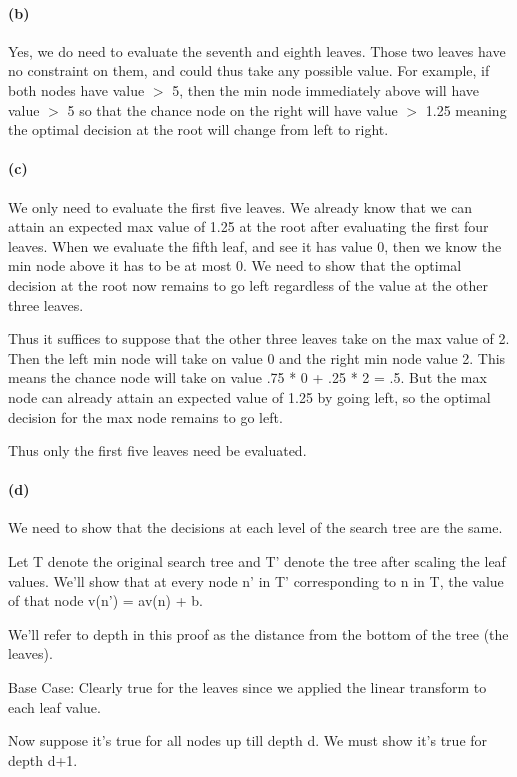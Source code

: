 \documentclass[11pt,a4paper]{article}
\begin{document}
\paragraph*{(b)}
Yes, we do need to evaluate the seventh and eighth leaves. Those two leaves have no constraint on them, and could thus take any possible value. For example, if both nodes have value $>$ 5, then the min node immediately above will have value $>$ 5 so that the chance node on the right will have value $>$ 1.25 meaning the optimal decision at the root will change from left to right.

\paragraph*{(c)}
We only need to evaluate the first five leaves. We already know that we can attain an expected max value of 1.25 at the root after evaluating the first four leaves. When we evaluate the fifth leaf, and see it has value 0, then we know the min node above it has to be at most 0. We need to show that the optimal decision at the root now remains to go left regardless of the value at the other three leaves. 

Thus it suffices to suppose that the other three leaves take on the max value of 2. Then the left min node will take on value 0 and the right min node value 2. This means the chance node will take on value .75 * 0 + .25 * 2 = .5. But the max node can already attain an expected value of 1.25 by going left, so the optimal decision for the max node remains to go left. 

Thus only the first five leaves need be evaluated.

\paragraph*{(d)}
We need to show that the decisions at each level of the search tree are the same.

Let T denote the original search tree and T' denote the tree after scaling the leaf values. We'll show that at every node n' in T' corresponding to n in T, the value of that node v(n') = av(n) + b.

We'll refer to depth in this proof as the distance from the bottom of the tree (the leaves). 

Base Case: Clearly true for the leaves since we applied the linear transform to each leaf value.

Now suppose it's true for all nodes up till depth d. We must show it's true for depth d+1.
\end{document}

